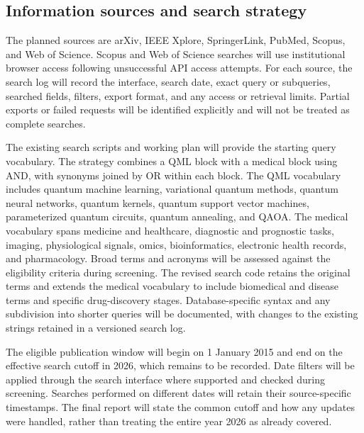 \documentclass[pdflatex,bst/sn-mathphys-num]{sn-jnl}
\begin{document}

\subsection{Information sources and search strategy}\label{sec:search-strategy}

The planned sources are arXiv, IEEE Xplore, SpringerLink, PubMed, Scopus, and Web of Science. Scopus and Web of Science searches will use institutional browser access following unsuccessful API access attempts. For each source, the search log will record the interface, search date, exact query or subqueries, searched fields, filters, export format, and any access or retrieval limits. Partial exports or failed requests will be identified explicitly and will not be treated as complete searches.

The existing search scripts and working plan will provide the starting query vocabulary. The strategy combines a QML block with a medical block using AND, with synonyms joined by OR within each block. The QML vocabulary includes quantum machine learning, variational quantum methods, quantum neural networks, quantum kernels, quantum support vector machines, parameterized quantum circuits, quantum annealing, and QAOA. The medical vocabulary spans medicine and healthcare, diagnostic and prognostic tasks, imaging, physiological signals, omics, bioinformatics, electronic health records, and pharmacology. Broad terms and acronyms will be assessed against the eligibility criteria during screening. The revised search code retains the original terms and extends the medical vocabulary to include biomedical and disease terms and specific drug-discovery stages. Database-specific syntax and any subdivision into shorter queries will be documented, with changes to the existing strings retained in a versioned search log.

The eligible publication window will begin on 1 January 2015 and end on the effective search cutoff in 2026, which remains to be recorded. Date filters will be applied through the search interface where supported and checked during screening. Searches performed on different dates will retain their source-specific timestamps. The final report will state the common cutoff and how any updates were handled, rather than treating the entire year 2026 as already covered.
\end{document}
